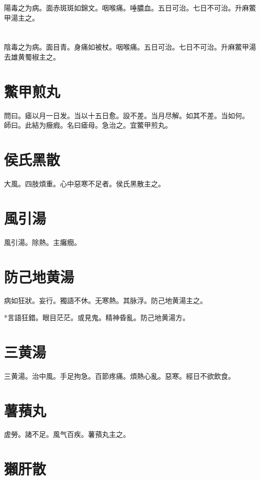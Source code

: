 陽毒之为病。面赤斑斑如錦文。咽喉痛。唾膿血。五日可治。七日不可治。升麻鱉甲湯主之。

\section{}

陰毒之为病。面目青。身痛如被杖。咽喉痛。五日可治。七日不可治。升麻鱉甲湯去雄黄蜀椒主之。

\section{鱉甲煎丸}

問曰。瘧以月一日发。当以十五日愈。設不差。当月尽解。如其不差。当如何。\\
師曰。此結为癥瘕。名曰瘧母。急治之。宜鱉甲煎丸。

\section{侯氏黑散}

大風。四肢煩重。心中惡寒不足者。侯氏黑散主之。

\section{風引湯}

風引湯。除熱。主癱癇。

\section{防己地黄湯}



病如狂狀。妄行。獨語不休。无寒熱。其脉浮。防己地黄湯主之。

*言語狂錯。眼目茫茫。或見鬼。精神昏亂。防己地黄湯方。{\qianjin}

\section{三黄湯}

三黄湯。治中風。手足拘急。百節疼痛。煩熱心亂。惡寒。經日不欲飲食。

\section{薯蕷丸}

虗勞。諸不足。風气百疾。薯蕷丸主之。

\section{獺肝散}

